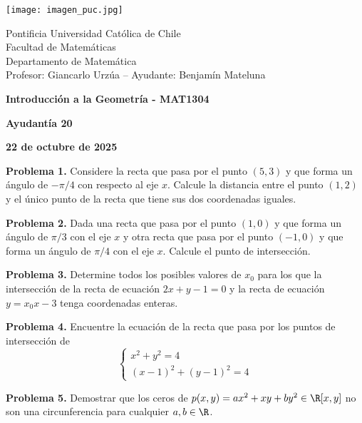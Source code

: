 \documentclass{article}
\begin{document}
\begin{minipage}{2.5cm}
    \texttt{[image: imagen\_puc.jpg]}
\end{minipage}
\begin{minipage}{14cm}
    {\sc Pontificia Universidad Católica de Chile\\
    Facultad de Matemáticas\\
    Departamento de Matemática\\
    Profesor: Giancarlo Urzúa -- Ayudante: Benjamín Mateluna}
\end{minipage}
\vspace{1ex}

{\centerline{\bf Introducción a la Geometría - MAT1304}
\centerline{\bf Ayudantía 20}}
\centerline{\bf 22 de octubre de 2025}

\vspace{1cm}
\noindent\textbf{Problema 1.} Considere la recta que pasa por el punto $(5,3)$ y que forma un
ángulo de $-\pi/4$ con respecto al eje $x$. Calcule la distancia entre el punto $(1,2)$ y
el único punto de la recta que tiene sus dos coordenadas iguales.

\vspace{5mm}
\noindent\textbf{Problema 2.} Dada una recta que pasa por el punto $(1,0)$ y que forma un ángulo
de $\pi/3$ con el eje $x$ y otra recta que pasa por el punto $(-1,0)$ y que forma un ángulo de
$\pi/4$ con el eje $x$. Calcule el punto de intersección.

\vspace{5mm}
\noindent\textbf{Problema 3.} Determine todos los posibles valores de $x_{0}$ para los que la
intersección de la recta de ecuación $2x+y-1=0$ y la recta de ecuación $y=x_{0}x-3$ tenga 
coordenadas enteras.

\vspace{5mm}
\noindent\textbf{Problema 4.} Encuentre la ecuación de la recta que pasa por los puntos de 
intersección de
\begin{equation*}
    \begin{cases}
        x^{2}+y^{2}=4 \\
        (x-1)^{2}+(y-1)^{2}=4
    \end{cases}
\end{equation*}

\vspace{5mm}
\noindent\textbf{Problema 5.} Demostrar que los ceros de $p(x,y)=ax^{2}+xy+by^{2}\in\R[x,y]$ no
son una circunferencia para cualquier $a,b\in\R$.

\end{document}
